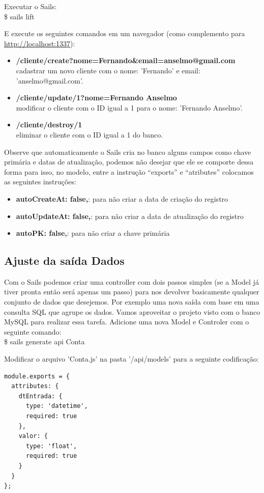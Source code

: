 \documentclass[a4paper,11pt]{article}
\begin{document}
Executar o Sails: \\
{\ttfamily\$ sails lift}

E execute os seguintes comandos em um navegador (como complemento para \url{http://localhost:1337}): \vspace{-1em}
\begin{itemize}
  \item \textbf{/cliente/create?nome=Fernando\&email=anselmo@gmail.com} \\
  cadastrar um novo cliente com o nome: 'Fernando' e email: 'anselmo@gmail.com'.
  \item \textbf{/cliente/update/1?nome=Fernando Anselmo} \\
  modificar o cliente com o ID igual a 1 para o nome: 'Fernando Anselmo'.
  \item \textbf{/cliente/destroy/1} \\
  eliminar o cliente com o ID igual a 1 do banco.
\end{itemize}
Observe que automaticamente o Sails cria no banco alguns campos como chave primária e datas de atualização, podemos não desejar que ele se comporte dessa forma para isso, no modelo, entre a instrução ``exports'' e ``atributes'' colocamos as seguintes instruções: \vspace{-1em}
\begin{itemize}
  \item \textbf{autoCreateAt: false,}: para não criar a data de criação do registro
  \item \textbf{autoUpdateAt: false,}: para não criar a data de atualização do registro
  \item \textbf{autoPK: false,}: para não criar a chave primária  
\end{itemize}

\subsection{Ajuste da saída Dados}
Com o Sails podemos criar uma controller com dois passos simples (se a Model já tiver pronta então será apenas um passo) para nos devolver basicamente qualquer conjunto de dados que desejemos. Por exemplo uma nova saída com base em uma consulta SQL que agrupe os dados. Vamos aproveitar o projeto visto com o banco MySQL para realizar essa tarefa. Adicione uma nova Model e Controler com o seguinte comando: \\
{\ttfamily\$ sails generate api Conta}

Modificar o arquivo 'Conta.js' na pasta '/api/models' para a seguinte codificação:
\begin{lstlisting}
module.exports = {
  attributes: {
    dtEntrada: {
      type: 'datetime',
      required: true
    },
    valor: {
      type: 'float',
      required: true
    }
  }
};
\end{lstlisting}
\end{document}

